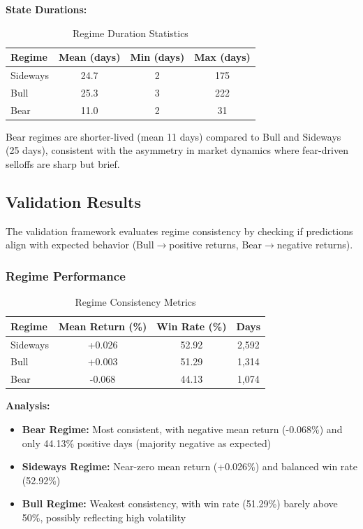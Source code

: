 \documentclass[conference]{IEEEtran}
\begin{document}
\textbf{State Durations:}
\begin{table}[htbp]
\centering
\caption{Regime Duration Statistics}
\label{tab:durations}
\begin{tabular}{lccc}
\toprule
\textbf{Regime} & \textbf{Mean (days)} & \textbf{Min (days)} & \textbf{Max (days)} \\
\midrule
Sideways & 24.7 & 2 & 175 \\
Bull & 25.3 & 3 & 222 \\
Bear & 11.0 & 2 & 31 \\
\bottomrule
\end{tabular}
\end{table}

Bear regimes are shorter-lived (mean 11 days) compared to Bull and Sideways (25 days), consistent with the asymmetry in market dynamics where fear-driven selloffs are sharp but brief.

\subsection{Validation Results}

The validation framework evaluates regime consistency by checking if predictions align with expected behavior (Bull$\rightarrow$positive returns, Bear$\rightarrow$negative returns).

\subsubsection{Regime Performance}
\begin{table}[htbp]
\centering
\caption{Regime Consistency Metrics}
\label{tab:regime_performance}
\begin{tabular}{lccc}
\toprule
\textbf{Regime} & \textbf{Mean Return (\%)} & \textbf{Win Rate (\%)} & \textbf{Days} \\
\midrule
Sideways & +0.026 & 52.92 & 2,592 \\
Bull & +0.003 & 51.29 & 1,314 \\
Bear & -0.068 & 44.13 & 1,074 \\
\bottomrule
\end{tabular}
\end{table}

\textbf{Analysis:}
\begin{itemize}
\item \textbf{Bear Regime:} Most consistent, with negative mean return (-0.068\%) and only 44.13\% positive days (majority negative as expected)
\item \textbf{Sideways Regime:} Near-zero mean return (+0.026\%) and balanced win rate (52.92\%)
\item \textbf{Bull Regime:} Weakest consistency, with win rate (51.29\%) barely above 50\%, possibly reflecting high volatility
\end{itemize}
\end{document}
